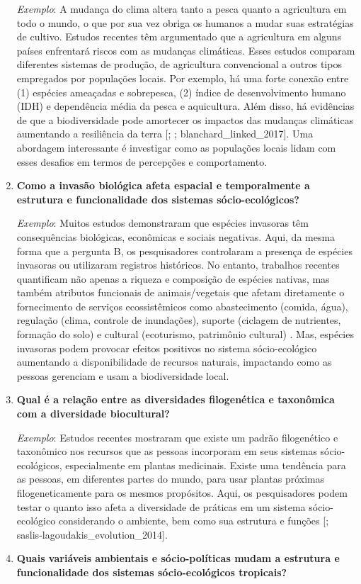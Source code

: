 \documentclass[
]{book}
\begin{document}
\begin{enumerate}
  \emph{Exemplo}: A mudança do clima altera tanto a pesca quanto a agricultura em todo o mundo, o que por sua vez obriga os humanos a mudar suas estratégias de cultivo. Estudos recentes têm argumentado que a agricultura em alguns países enfrentará riscos com as mudanças climáticas. Esses estudos comparam diferentes sistemas de produção, de agricultura convencional a outros tipos empregados por populações locais. Por exemplo, há uma forte conexão entre (1) espécies ameaçadas e sobrepesca, (2) índice de desenvolvimento humano (IDH) e dependência média da pesca e aquicultura. Além disso, há evidências de que a biodiversidade pode amortecer os impactos das mudanças climáticas aumentando a resiliência da terra {[}\citet{niggli_low_2009}; \citet{altieri_adaptation_2017}; blanchard\_linked\_2017{]}. Uma abordagem interessante é investigar como as populações locais lidam com esses desafios em termos de percepções e comportamento.
\item
  \textbf{Como a invasão biológica afeta espacial e temporalmente a estrutura e funcionalidade dos sistemas sócio-ecológicos?}

  \emph{Exemplo}: Muitos estudos demonstraram que espécies invasoras têm consequências biológicas, econômicas e sociais negativas. Aqui, da mesma forma que a pergunta B, os pesquisadores controlaram a presença de espécies invasoras ou utilizaram registros históricos. No entanto, trabalhos recentes quantificam não apenas a riqueza e composição de espécies nativas, mas também atributos funcionais de animais/vegetais que afetam diretamente o fornecimento de serviços ecossistêmicos como abastecimento (comida, água), regulação (clima, controle de inundações), suporte (ciclagem de nutrientes, formação do solo) e cultural (ecoturismo, patrimônio cultural) \citep{chaffin_biological_2016}. Mas, espécies invasoras podem provocar efeitos positivos no sistema sócio-ecológico aumentando a disponibilidade de recursos naturais, impactando como as pessoas gerenciam e usam a biodiversidade local.
\item
  \textbf{Qual é a relação entre as diversidades filogenética e taxonômica com a diversidade biocultural?}

  \emph{Exemplo}: Estudos recentes mostraram que existe um padrão filogenético e taxonômico nos recursos que as pessoas incorporam em seus sistemas sócio-ecológicos, especialmente em plantas medicinais. Existe uma tendência para as pessoas, em diferentes partes do mundo, para usar plantas próximas filogeneticamente para os mesmos propósitos. Aqui, os pesquisadores podem testar o quanto isso afeta a diversidade de práticas em um sistema sócio-ecológico considerando o ambiente, bem como sua estrutura e funções {[}\citet{saslis-lagoudakis_phylogenies_2012}; saslis-lagoudakis\_evolution\_2014{]}.
\item
  \textbf{Quais variáveis ambientais e sócio-políticas mudam a estrutura e funcionalidade dos sistemas sócio-ecológicos tropicais?}


\end{enumerate}
\end{document}
